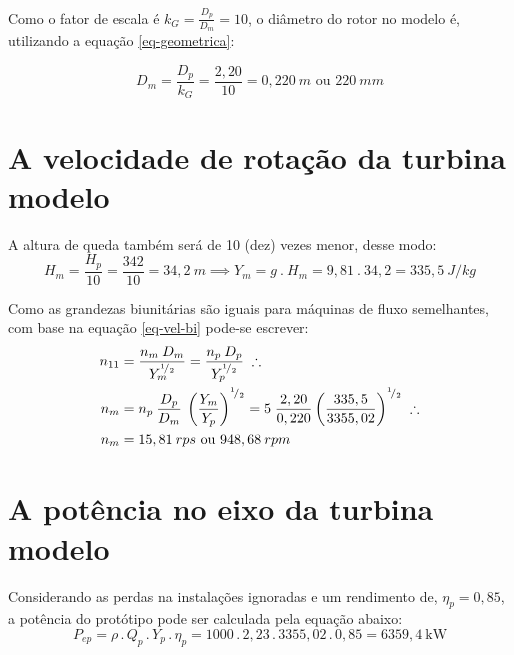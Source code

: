     Como o fator de escala é $k_G = \frac{D_p}{D_m} = 10$, o diâmetro do rotor no modelo é, utilizando a equação \eqref{eq-geometrica}:

    \begin{equation*}
        D_m = \frac{D_p}{k_G} = \frac{2,20}{10} = 0,220\:m \mbox{ ou } 220\: mm
    \end{equation*}

\section{A velocidade de rotação da turbina modelo}

    A altura de queda também será de 10 (dez) vezes menor, desse modo:
    \begin{equation*}
        H_m = \frac{H_p}{10} = \frac{342}{10} = 34,2\:m \implies Y_m = g \: . \: H_m = 9,81 \: . \: 34,2 = 335,5\: J/kg
    \end{equation*}

    Como as grandezas biunitárias são iguais para máquinas de fluxo semelhantes, com base na equação \eqref{eq-vel-bi} pode-se escrever:
    \begin{equation*}
        \begin{split}
            n_{11} &= \frac{n_m \: D_m}{Y_m^{{}^{1}\!/_{2}}} = \frac{n_p \: D_p}{Y_p^{{}^{1}\!/_{2}}} \; \therefore \\
            n_m &= n_p \: \frac{D_p}{D_m}\: \left(\frac{Y_m}{Y_p} \right)^{{}^{1}\!/_{2}} = 5\; \frac{2,20}{0,220} \left( \frac{335,5}{3355,02} \right)^{{}^{1}\!/_{2}} \; \therefore \\
            n_m &= 15,81 \: rps \mbox{ ou } 948,68\: rpm
        \end{split}
    \end{equation*}

\section{A potência no eixo da turbina modelo}

    Considerando as perdas na instalações ignoradas e um rendimento de, $\eta_p = 0,85$, a potência do protótipo pode ser calculada pela equação abaixo:
    \begin{equation*}
        P_{ep} = \rho \, . \, Q_p \, . \, Y_p \, . \, \eta_p = 1000 \, . \, 2,23 \, . \, 3355,02 \, . \, 0,85 = 6359,4 \: \mbox{kW}
    \end{equation*}

